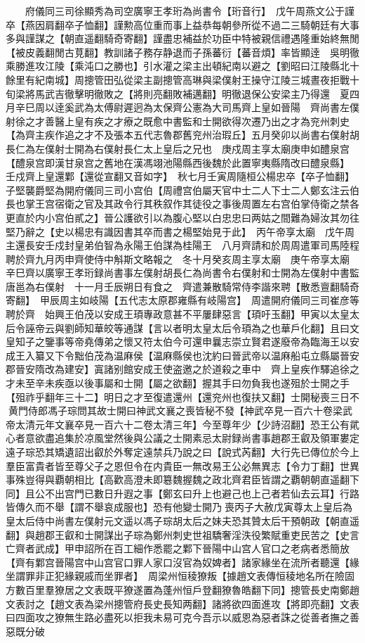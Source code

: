 　　府儀同三司徐顯秀為司空廣寧王孝珩為尚書令【珩音行】　戊午周燕文公于謹卒【燕因肩翻卒子恤翻】謹勲高位重而事上益恭每朝參所從不過二三騎朝廷有大事多與謹謀之【朝直遥翻騎奇寄翻】謹盡忠補益於功臣中特被親信禮遇隆重始終無閒【被皮義翻閒古莧翻】教訓諸子務存静退而子孫蕃衍【蕃音煩】率皆顯逹　吳明徹乘勝進攻江陵【乘沌口之勝也】引水灌之梁主出頓紀南以避之【劉昭曰江陵縣北十餘里有紀南城】周摠管田弘從梁主副摠管高琳與梁僕射王操守江陵三城晝夜拒戰十旬梁將馬武吉徹擊明徹敗之【將則亮翻敗補邁翻】明徹退保公安梁主乃得還　夏四月辛巳周以逹奚武為太傅尉遲迥為太保齊公憲為大司馬齊上皇如晉陽　齊尚書左僕射徐之才善醫上皇有疾之才療之既愈中書監和士開欲得次遷乃出之才為兖州刺史【為齊主疾作追之才不及張本五代志魯郡舊兖州治瑕丘】五月癸卯以尚書右僕射胡長仁為左僕射士開為右僕射長仁太上皇后之兄也　庚戍周主享太廟庚申如醴泉宫【醴泉宫即漢甘泉宫之舊地在漢馮翊池陽縣西後魏於此置寧夷縣隋改曰醴泉縣】　壬戍齊上皇還鄴【還從宣翻又音如字】　秋七月壬寅周隨桓公楊忠卒【卒子恤翻】子堅襲爵堅為開府儀同三司小宫伯【周禮宫伯屬天官中士二人下士二人鄭玄注云伯長也掌王宫宿衛之官及其政令行其秩叙作其徒役之事後周置左右宫伯掌侍衛之禁各更直於内小宫伯貳之】晉公護欲引以為腹心堅以白忠忠曰两姑之間難為婦汝其勿往堅乃辭之【史以楊忠有識因書其卒而書之楊堅始見于此】　丙午帝享太廟　戊午周主還長安壬戍封皇弟伯智為永陽王伯謀為桂陽王　八月齊請和於周周遣軍司馬陸程聘於齊九月丙申齊使侍中斛斯文略報之　冬十月癸亥周主享太廟　庚午帝享太廟　辛巳齊以廣寧王孝珩録尚書事左僕射胡長仁為尚書令右僕射和士開為左僕射中書監唐邕為右僕射　十一月壬辰朔日有食之　齊遣兼散騎常侍李諧來聘【散悉亶翻騎奇寄翻】　甲辰周主如岐陽【五代志太原郡雍縣有岐陽宫】　周遣開府儀同三司崔彦等聘於齊　始興王伯茂以安成王頊專政意甚不平屢肆惡言【頊吁玉翻】甲寅以太皇太后令誣帝云與劉師知華皎等通謀【言以者明太皇太后令頊為之也華戶化翻】且曰文皇知子之鑒事等帝堯傳弟之懷又符太伯今可還申曩志崇立賢君遂廢帝為臨海王以安成王入纂又下令黜伯茂為温麻侯【温麻縣侯也沈約曰晉武帝以温麻船屯立縣屬晉安郡晉安隋改為建安】寘諸别館安成王使盗邀之於道殺之車中　齊上皇疾作驛追徐之才未至辛未疾亟以後事屬和士開【屬之欲翻】握其手曰勿負我也遂殂於士開之手【殂祚乎翻年三十二】明日之才至復遣還州【還兖州也復扶又翻】士開秘喪三日不黄門侍郎馮子琮問其故士開曰神武文襄之喪皆秘不發【神武卒見一百六十卷梁武帝太清元年文襄卒見一百六十二卷太清三年】今至尊年少【少詩沼翻】恐王公有貮心者意欲盡追集於凉風堂然後與公議之士開素忌太尉録尚書事趙郡王叡及領軍婁定遠子琮恐其矯遺詔出叡於外奪定遠禁兵乃說之曰【說式芮翻】大行先已傳位於今上羣臣富貴者皆至尊父子之恩但令在内貴臣一無改易王公必無異志【令力丁翻】世異事殊豈得與覇朝相比【高歡高澄未即簒魏握魏之政北齊君臣皆謂之覇朝朝直遥翻下同】且公不出宫門已數日升遐之事【鄭玄曰升上也避己也上己者若仙去云耳】行路皆傳久而不舉【謂不舉哀成服也】恐有他變士開乃喪丙子大赦戊寅尊太上皇后為皇太后侍中尚書左僕射元文遥以馮子琮胡太后之妹夫恐其贊太后干預朝政【朝直遥翻】與趙郡王叡和士開謀出子琮為鄭州刺史世祖驕奢淫泆役繁賦重吏民苦之【史言亡齊者武成】甲申詔所在百工細作悉罷之鄴下晉陽中山宫人官口之老病者悉簡放【齊有鄴宫晉陽宫中山宫官口罪人家口沒官為奴婢者】諸家緣坐在流所者聽還【緣坐謂罪非正犯緣親戚而坐罪者】　周梁州恒稜獠叛【據趙文表傳恒稜地名所在險固方數百里羣獠居之文表既平獠遂置為蓬州恒戶登翻獠魯皓翻下同】摠管長史南鄭趙文表討之【趙文表為梁州摠管府長史長知两翻】諸將欲四面進攻【將即亮翻】文表曰四面攻之獠無生路必盡死以拒我未易可克今吾示以威恩為惡者誅之從善者撫之善惡既分破